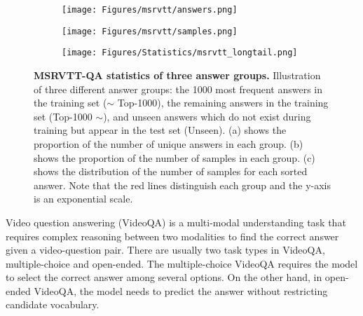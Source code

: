 \documentclass[10pt,twocolumn,letterpaper]{article}
\begin{document}
\begin{figure}[t] 
    \centering
    \begin{subfigure}[t]{0.34\linewidth}
        \texttt{[image: Figures/msrvtt/answers.png]}
        \caption{ }
        \label{fig:answers}
    \end{subfigure}
    \begin{subfigure}[t]{0.30\linewidth}
        \texttt{[image: Figures/msrvtt/samples.png]}
        \caption{ }
        \label{fig:samples}
    \end{subfigure}
    \begin{subfigure}[t]{0.34\linewidth}
        \texttt{[image: Figures/Statistics/msrvtt\_longtail.png]}
        \caption{ }
        \label{fig:line}
    \end{subfigure}
    \caption{\textbf{MSRVTT-QA statistics of three answer groups.} 
    Illustration of three different answer groups: the 1000 most frequent answers in the training set ($\sim$ Top-1000), 
    the remaining answers in the training set (Top-1000 $\sim$), and unseen answers which do not exist during training but appear in the test set (Unseen).
    (a) shows the proportion of the number of unique answers in each group.
    (b) shows the proportion of the number of samples in each group.
    (c) shows the distribution of the number of samples for each sorted answer.
    Note that the red lines distinguish each group and the y-axis is an exponential scale.
    }
    \label{fig:msrvtt}
\end{figure} 
Video question answering (VideoQA) is a multi-modal understanding task that requires complex reasoning between two modalities to find the correct answer given a video-question pair.
There are usually two task types in VideoQA, multiple-choice and open-ended.
The multiple-choice VideoQA requires the model to select the correct answer among several options.
On the other hand, in open-ended VideoQA, the model needs to predict the answer without restricting candidate vocabulary.
\end{document}
